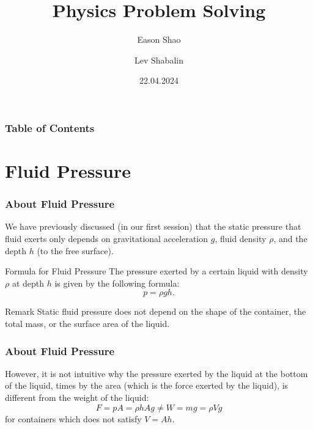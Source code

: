 \documentclass{beamer}
\title[Physics Problem Solving]{Physics Problem Solving}
\author{Eason Shao \and Lev Shabalin}
\institute[]{Physics Problem Solving Society\\St Paul's School}
\date{22.04.2024}
\begin{document}
    \frame{\titlepage}
    
    \begin{frame}
        \frametitle{Table of Contents}
        \tableofcontents
    \end{frame}
    
    \section{Fluid Pressure}
        \begin{frame}
            \frametitle{About Fluid Pressure}
            We have previously discussed (in our first session) that the static pressure that fluid exerts only depends on gravitational acceleration $g$, fluid density $\rho$, and the depth $h$ (to the free surface).\pause
        
            \begin{alertblock}{Formula for Fluid Pressure}
                The pressure exerted by a certain liquid with density $\rho$ at depth $h$ is given by the following formula:
                $$p = \rho g h.$$
            \end{alertblock}\pause
        
            \begin{block}{Remark}
                Static fluid pressure does not depend on the shape of the container, the total mass, or the surface area of the liquid.
            \end{block}
        \end{frame}
        
        \begin{frame}
        \frametitle{About Fluid Pressure}
            However, it is not intuitive why the pressure exerted by the liquid at the bottom of the liquid, times by the area (which is the force exerted by the liquid), is different from the weight of the liquid:
            $$
            F = pA = \rho h A g \neq W = mg = \rho V g
            $$
            for containers which does not satisfy $V = Ah$.
        \end{frame}
        
\end{document}
